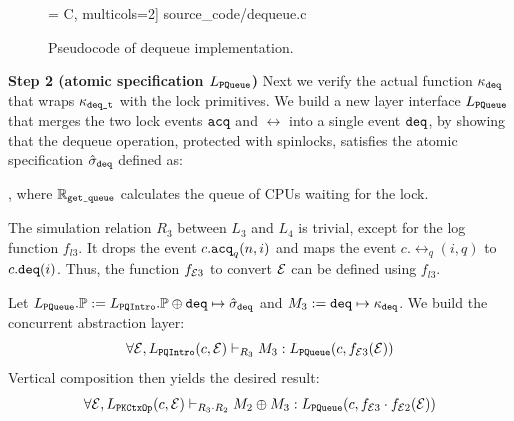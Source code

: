 {\begin{figure}[t]
 = C, multicols=2] {source_code/dequeue.c}
\caption{Pseudocode of dequeue implementation.}
\label{fig:exp:dequeue}
\hrulefill
\end{figure}

\noindent\textbf{Step 2 (atomic specification $L_\pqueue$)}
Next we verify the actual function $\module_{\deq}$ that wraps
$\module_{\deq\comm{\_t}}$ with the lock primitives.
We build a new layer interface $L_\pqueue$ that merges the two lock events
$\acq$ and $\rel$ into a single event $\deq$,
by showing that the dequeue operation, protected with spinlocks,
satisfies the atomic specification $\spec_{\deq}$ defined as:
\begin{mathpar}
\end{mathpar}
, where $\replay_\comm{get\_queue}$
calculates the queue of CPUs waiting for the lock.

The simulation relation 
$R_{3}$ between $L_3$ and $L_4$ is trivial,
except for the log function $f_{l3}$.
It drops the event $c.\acq_q(n,i)$
and maps the event $c.\rel_q(i, q)$
to $c.\deq(i)$. Thus, the function $f_{\oracle 3}$ to convert
$\oracle$ can be defined using $f_{l3}$.
Let $L_\pqueue.\primt := L_\pqintro.\primt \oplus \deq \mapsto \spec_{\deq}$ 
and
$M_3 :=  \deq \mapsto \module_{\deq}$.
We build the concurrent abstraction layer:
\[
\forall \oracle, 
\ltyp{L_\pqintro(c, \oracle)}{R_3}{M_3}{L_\pqueue(c, f_{\oracle 3} (\oracle))}
\]
Vertical composition then yields the desired result:
\[
\forall \oracle, 
\ltyp{L_\pkctxop(c,\oracle)}{R_3\cdot R_2}{M_2 \oplus M_3}{L_\pqueue(c,f_{\oracle 3} \cdot f_{\oracle 2}(\oracle))}
\]

}
